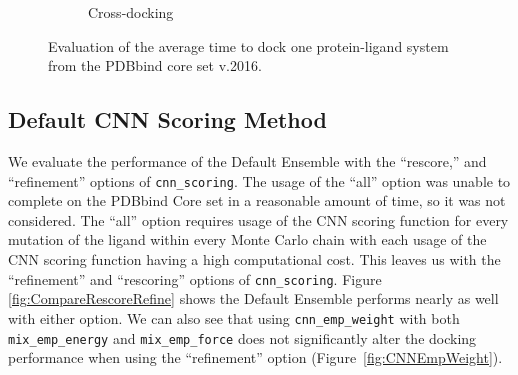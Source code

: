 \documentclass[journal=jcisd8,manuscript=article]{achemso}
\begin{document}
\begin{figure}
\begin{subfigure}[b]{0.48\textwidth}
                \caption{Cross-docking}
                \label{fig:OptimalRescCD}
        \end{subfigure}    
        \caption{Evaluation of the average time to dock one protein-ligand system from the PDBbind core set v.2016.}
        \label{fig:OptimalRescore}
\end{figure}    

\subsection{Default CNN Scoring Method}
 We evaluate the performance of the Default Ensemble with the ``rescore,'' and ``refinement'' options of \texttt{cnn\_scoring}. The usage of the ``all'' option was unable to complete on the PDBbind Core set in a reasonable amount of time, so it was not considered. The ``all'' option requires usage of the CNN scoring function for every mutation of the ligand within every Monte Carlo chain with each usage of the CNN scoring function having a high computational cost. This leaves us with the ``refinement'' and ``rescoring'' options of \texttt{cnn\_scoring}. Figure \ref{fig:CompareRescoreRefine} shows the Default Ensemble performs nearly as well with either option. We can also see that using \texttt{cnn\_emp\_weight} with both \texttt{mix\_emp\_energy} and \texttt{mix\_emp\_force} does not significantly alter the docking performance when using the ``refinement'' option (Figure~\ref{fig:CNNEmpWeight}).
\end{document}
